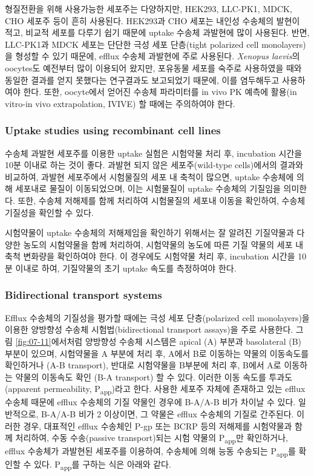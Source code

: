 \documentclass[
  11pt,
  krantz2, a4paper, twoside]{krantz}
\begin{document}
형질전환을 위해 사용가능한 세포주는 다양하지만, HEK293, LLC-PK1, MDCK,
CHO 세포주 등이 흔히 사용된다. HEK293과 CHO 세포는 내인성 수송체의
발현이 적고, 비교적 세포를 다루기 쉽기 때문에 uptake 수송체 과발현에
많이 사용된다. 반면, LLC-PK1과 MDCK 세포는 단단한 극성 세포 단층(tight
polarized cell monolayers)을 형성할 수 있기 때문에, efflux 수송체
과발현에 주로 사용된다. \emph{Xenopus laevis}의 oocytes도 예전부터 많이
이용되어 왔지만, 포유동물 세포를 숙주로 사용하였을 때와 동일한 결과를
얻지 못했다는 연구결과도 보고되었기 때문에, 이를 염두해두고 사용하여야
한다. 또한, oocyte에서 얻어진 수송체 파라미터를 in vivo PK 예측에
활용(in vitro-in vivo extrapolation, IVIVE) 할 때에는 주의하여야 한다.

\hypertarget{uptake-studies-using-recombinant-cell-lines}{%
\subsubsection{Uptake studies using recombinant cell lines}\label{uptake-studies-using-recombinant-cell-lines}}

수송체 과발현 세포주를 이용한 uptake 실험은 시험약물 처리 후, incubation
시간을 10분 이내로 하는 것이 좋다. 과발현 되지 않은 세포주(wild-type
cells)에서의 결과와 비교하여, 과발현 세포주에서 시험물질의 세포 내
축척이 많으면, uptake 수송체에 의해 세포내로 물질이 이동되었으며, 이는
시험물질이 uptake 수송체의 기질임을 의미한다. 또한, 수송체 저해제를 함께
처리하여 시험물질의 세포내 이동을 확인하여, 수송체 기질성을 확인할 수
있다.

시험약물이 uptake 수송체의 저해제임을 확인하기 위해서는 잘 알려진
기질약물과 다양한 농도의 시험약물을 함께 처리하여, 시험약물의 농도에
따른 기질 약물의 세포 내 축척 변화량을 확인하여야 한다. 이 경우에도
시험약물 처리 후, incubation 시간을 10분 이내로 하여, 기질약물의 초기
uptake 속도를 측정하여야 한다.

\hypertarget{bidirectional-transport-systems}{%
\subsubsection{Bidirectional transport systems}\label{bidirectional-transport-systems}}

Efflux 수송체의 기질성을 평가할 때에는 극성 세포 단층(polarized cell
monolayers)을 이용한 양방향성 수송체 시험법(bidirectional transport
assays)을 주로 사용한다. 그림 \ref{fig:07-11}에서처럼 양방향성 수송체 시스템은
apical (A) 부분과 basolateral (B) 부분이 있으며, 시험약물을 A 부분에
처리 후, A에서 B로 이동하는 약물의 이동속도를 확인하거나 (A-B
transport), 반대로 시험약물을 B부분에 처리 후, B에서 A로 이동하는 약물의
이동속도 확인 (B-A transport) 할 수 있다. 이러한 이동 속도를
투과도(apparent permeability, P\textsubscript{app})라고 한다. 사용한 세포주 자체에
존재하고 있는 efflux 수송체 때문에 efflux 수송체의 기질 약물인 경우에
B-A/A-B 비가 차이날 수 있다. 일반적으로, B-A/A-B 비가 2 이상이면, 그
약물은 efflux 수송체의 기질로 간주된다. 이러한 경우, 대표적인 efflux
수송체인 P-gp 또는 BCRP 등의 저해제를 시험약물과 함께 처리하여, 수동
수송(passive transport)되는 시험 약물의 P\textsubscript{app}만 확인하거나, efflux
수송체가 과발현된 세포주를 이용하여, 수송체에 의해 능동 수송되는
P\textsubscript{app}를 확인할 수 있다. P\textsubscript{app}를 구하는 식은 아래와 같다.
\end{document}
